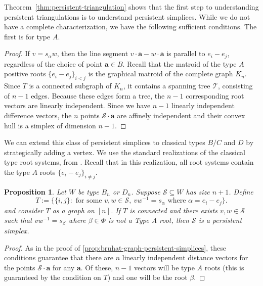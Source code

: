 \documentclass{amsart}
\newtheorem{prop}[thm]{Proposition}
\theoremstyle{definition}
\newcommand{\sT}{\mathscr{T}}
\def\ba{\mathbf{a}}
\def\cS{\mathcal{S}}
\begin{document}
Theorem~\ref{thm:persistent-triangulation} shows that the first step to understanding persistent triangulations is to understand persistent simplices. While we do not have a complete characterization, we have the following sufficient conditions. The first is for type $A$.


\begin{proof}
    If $v = s_{\alpha} w$, then the line segment $v \cdot \ba - w \cdot \ba$ is parallel to $e_i-e_j$, regardless of the choice of point $\ba \in B$. Recall that the matroid of the type $A$ positive roots $\{e_i-e_j\}_{i<j}$ is the graphical matroid of the complete graph $K_n$. Since $T$ is a connected subgraph of $K_n$, it contains a spanning tree $\sT$, consisting of $n-1$ edges. Because these edges form a tree, the $n-1$ corresponding root vectors are linearly independent. Since we have $n-1$ linearly independent difference vectors, the $n$ points $\cS \cdot \ba$ are affinely independent and their convex hull is a simplex of dimension $n-1$.
\end{proof}



We can extend this class of persistent simplices to classical types $B/C$ and $D$ by strategically adding a vertex. We use the standard realizations of the classical type root systems, from \cite[2.10]{Humphreys90}. Recall that in this realization, all root systems contain the type $A$ roots $\{e_i - e_j\}_{i \neq j}$.

\begin{prop}\label{prop:bruhat-graph-persistent-simplices-BC}
    Let $W$ be type $B_n$ or $D_n$. Suppose $\cS \subseteq W$ has size $n+1$. Define 
    \[T:=\{\{i, j\}: \text{ for some }v, w \in \cS,~ vw^{-1}=s_{\alpha} \text{ where } \alpha=e_i - e_j\}.\]
    and consider $T$ as a graph on $[n]$. If $T$ is connected and there exists $v,w \in \cS$ such that $v w^{-1} = s_{\beta}$ where $\beta \in \Phi$ is \emph{not} a Type A root, then $\cS$ is a persistent simplex.
\end{prop}

\begin{proof}
    As in the proof of \cref{prop:bruhat-graph-persistent-simplices}, these conditions guarantee that there are $n$ linearly independent distance vectors for the points $\cS\cdot \ba$ for any $\ba$. Of these, $n-1$ vectors will be type $A$ roots (this is guaranteed by the condition on $T$) and one will be the root $\beta$.
\end{proof}
\end{document}
